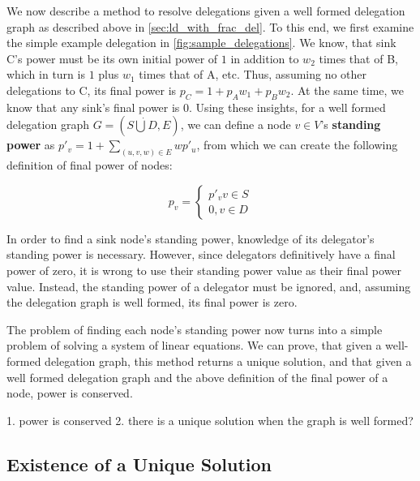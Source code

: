 We now describe a method to resolve delegations given a well formed delegation graph as described above in \cref{sec:ld_with_frac_del}. To this end, we first examine the simple example delegation in \cref{fig:sample_delegations}. We know, that sink C's power must be its own initial power of $1$ in addition to $w_2$ times that of B, which in turn is $1$ plus $w_1$ times that of A, etc. Thus, assuming no other delegations to C, its final power is $p_C = 1 + p_Aw_1 + p_Bw_2$. At the same time, we know that any sink's final power is $0$. Using these insights, for a well formed delegation graph $G=(S\dot\bigcup D, E)$, we can define a node $v \in V$'s \textbf{standing power} as $p'_v = 1 + \sum_{(u, v, w) \in E} wp'_u$, from which we can create the following definition of final power of nodes:

\[
p_v = 
\begin{cases}
 p'_v v \in S \\ 
 0, v \in D 
 \end{cases}
\]

In order to find a sink node's standing power, knowledge of its delegator's standing power is necessary. However, since delegators definitively have a final power of zero, it is wrong to use their standing power value as their final power value. Instead, the standing power of a delegator must be ignored, and, assuming the delegation graph is well formed, its final power is zero. 

The problem of finding each node's standing power now turns into a simple problem of solving a system of linear equations. We can prove, that given a well-formed delegation graph, this method returns a unique solution, and that given a well formed delegation graph and the above definition of the final power of a node, power is conserved.

1. power is conserved
2. there is a unique solution when the graph is well formed?

\subsection{Existence of a Unique Solution}


